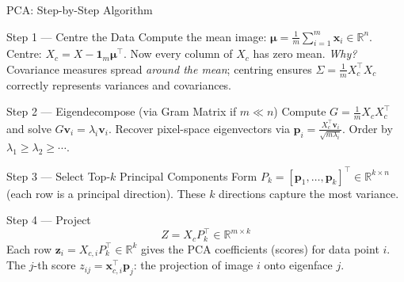 \documentclass{beamer}
\begin{document}
\begin{frame}[shrink=10]{PCA: Step-by-Step Algorithm}
  \begin{block}{Step 1 --- Centre the Data}
    Compute the mean image:
    $\boldsymbol{\mu} = \frac{1}{m}\sum_{i=1}^m \mathbf{x}_i
                      \in \mathbb{R}^n$.
    Centre:
    $X_c = X - \mathbf{1}_m\boldsymbol{\mu}^\top$.
    Now every column of $X_c$ has zero mean.
    \emph{Why?} Covariance measures spread \emph{around the mean};
    centring ensures $\Sigma = \frac{1}{m}X_c^\top X_c$ correctly
    represents variances and covariances.
  \end{block}

  \begin{block}{Step 2 --- Eigendecompose (via Gram Matrix if $m \ll n$)}
    Compute $G = \frac{1}{m}X_c X_c^\top$ and solve $G\mathbf{v}_i = \lambda_i\mathbf{v}_i$.
    Recover pixel-space eigenvectors via
    $\mathbf{p}_i = \frac{X_c^\top\mathbf{v}_i}{\sqrt{m\lambda_i}}$.
    Order by $\lambda_1 \geq \lambda_2 \geq \cdots$.
  \end{block}

  \begin{block}{Step 3 --- Select Top-$k$ Principal Components}
    Form $P_k = [\mathbf{p}_1,\ldots,\mathbf{p}_k]^\top \in \mathbb{R}^{k \times n}$
    (each row is a principal direction).
    These $k$ directions capture the most variance.
  \end{block}

  \begin{block}{Step 4 --- Project}
    \[
      Z = X_c P_k^\top \in \mathbb{R}^{m \times k}
    \]
    Each row $\mathbf{z}_i = X_{c,i}P_k^\top \in \mathbb{R}^k$ gives
    the PCA coefficients (scores) for data point $i$.
    The $j$-th score $z_{ij} = \mathbf{x}_{c,i}^\top \mathbf{p}_j$:
    the projection of image $i$ onto eigenface $j$.
  \end{block}
\end{frame}
\end{document}
